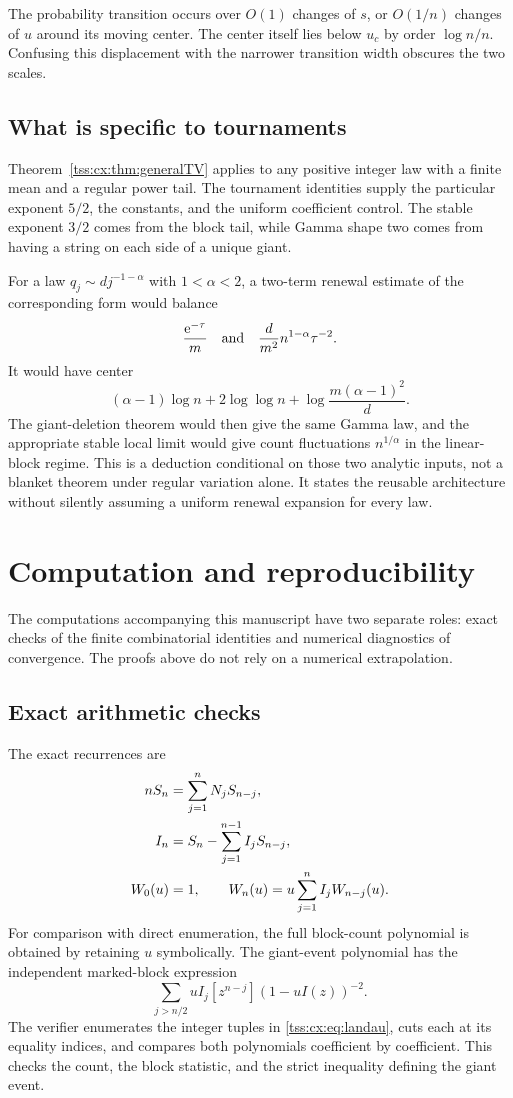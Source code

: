 \documentclass[11pt]{article}
\theoremstyle{remark}\newtheorem{remark}[theorem]{Remark}
\theoremstyle{definition}\newtheorem{definition}[theorem]{Definition}
\newcommand{\e}{\mathrm e}
\begin{document}
The probability transition occurs over $O(1)$ changes of $s$, or
$O(1/n)$ changes of $u$ around its moving center. The center itself
lies below $u_c$ by order $\log n/n$. Confusing this displacement
with the narrower transition width obscures the two scales.

\subsection{What is specific to tournaments}
Theorem~\ref{tss:cx:thm:generalTV} applies to any positive integer law with
a finite mean and a regular power tail. The tournament identities
supply the particular exponent $5/2$, the constants, and the
uniform coefficient control. The stable exponent $3/2$ comes from
the block tail, while Gamma shape two comes from having a string on
each side of a unique giant.

For a law $q_j\sim d j^{-1-\alpha}$ with $1<\alpha<2$, a two-term
renewal estimate of the corresponding form would balance
\[
 \frac{\e^{-\tau}}m
 \quad\hbox{and}\quad
 \frac{d}{m^2}n^{1-\alpha}\tau^{-2}.
\]
It would have center
\[
 (\alpha-1)\log n+2\log\log n
 +\log\frac{m(\alpha-1)^2}{d}.
\]
The giant-deletion theorem would then give the same Gamma law, and
the appropriate stable local limit would give count fluctuations
$n^{1/\alpha}$ in the linear-block regime. This is a deduction
conditional on those two analytic inputs, not a blanket theorem
under regular variation alone. It states the reusable architecture
without silently assuming a uniform renewal expansion for every law.

\section{Computation and reproducibility}
\label{tss:cx:sec:computation}
The computations accompanying this manuscript have two separate
roles: exact checks of the finite combinatorial identities and
numerical diagnostics of convergence. The proofs above do not rely
on a numerical extrapolation.

\subsection{Exact arithmetic checks}
The exact recurrences are
\begin{align}
 nS_n&=\sum_{j=1}^nN_jS_{n-j},\label{tss:cx:eq:exactrec}\\
 I_n&=S_n-\sum_{j=1}^{n-1}I_jS_{n-j},\notag\\
 W_0(u)&=1,\qquad
 W_n(u)=u\sum_{j=1}^nI_jW_{n-j}(u).\notag
\end{align}
For comparison with direct enumeration, the full block-count
polynomial is obtained by retaining $u$ symbolically. The giant-event
polynomial has the independent marked-block expression
\begin{equation}\label{tss:cx:eq:exactgiantpoly}
 \sum_{j>n/2}uI_j[z^{n-j}](1-uI(z))^{-2}.
\end{equation}
The verifier enumerates the integer tuples in \eqref{tss:cx:eq:landau}, cuts
each at its equality indices, and compares both polynomials
coefficient by coefficient. This checks the count, the block
statistic, and the strict inequality defining the giant event.
\end{document}
